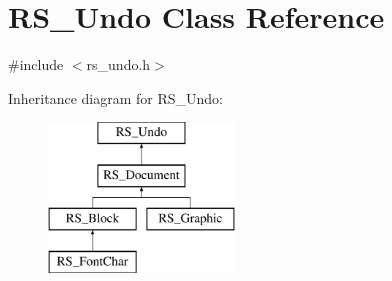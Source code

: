 \hypertarget{classRS__Undo}{\section{R\-S\-\_\-\-Undo Class Reference}
\label{classRS__Undo}
}


{\ttfamily \#include $<$rs\-\_\-undo.\-h$>$}

Inheritance diagram for R\-S\-\_\-\-Undo\-:\begin{figure}[H]
\begin{center}
\leavevmode
\includegraphics[height=4.000000cm]{classRS__Undo}
\end{center}
\end{figure}

